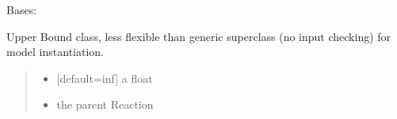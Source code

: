 \documentclass[letterpaper,12pt,english]{sphinxmanual}
\begin{document}
\begin{fulllineitems}
\label{\detokenize{api/core:cbmpy.CBModel.FluxBoundUpper}}
\pysigstartsignatures
\pysiglinewithargsret
{}
{\sphinxparamcomma {}}
{}
\pysigstopsignatures
\sphinxAtStartPar
Bases: {\hyperref[\detokenize{api/core:cbmpy.CBModel.FluxBoundBase}]{}}

\begin{fulllineitems}
\label{\detokenize{api/core:cbmpy.CBModel.FluxBoundUpper.__init__}}
\pysigstartsignatures
\pysiglinewithargsret
{}
{\sphinxparamcomma {}}
{}
\pysigstopsignatures
\sphinxAtStartPar
Upper Bound class, less flexible than generic superclass (no input checking) for model instantiation.
\begin{quote}\begin{description}
\begin{itemize}
\item {} 
\sphinxAtStartPar
{} \textendash{} {[}default=inf{]} a float

\item {} 
\sphinxAtStartPar
{} \textendash{} the parent Reaction

\end{itemize}

\end{description}\end{quote}

\end{fulllineitems}


\end{fulllineitems}

\end{document}
